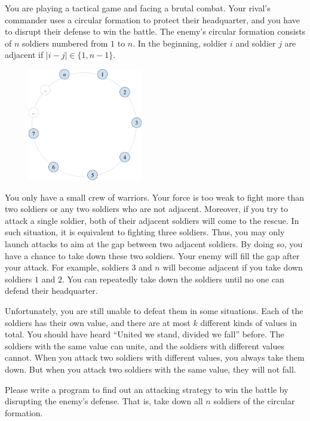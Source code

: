 You are playing a tactical game and facing a brutal combat. 
Your rival's commander uses a circular formation to protect their headquarter, 
and you have to disrupt their defense to win the battle.
The enemy's circular formation consists of $n$ soldiers numbered from $1$ to $n$. 
In the beginning, soldier $i$ and soldier $j$ are 
adjacent if $|i-j|\in\{1,n-1\}$.
\begin{figure}[h]
\center
\includegraphics[width=5cm]{image/d-circle.pdf}
\end{figure}

You only have a small crew of warriors. 
Your force is too weak to fight more than two soldiers or any two soldiers
who are not adjacent. 
Moreover, if you try to attack a single soldier, both of their adjacent
soldiers will come to the rescue.
In such situation, it is equivalent to fighting three soldiers.
Thus, you may only launch attacks to aim at the gap between 
two adjacent soldiers.
By doing so, you have a chance to take down these two soldiers.
Your enemy will fill the gap after your attack. 
For example, soldiers $3$ and $n$ will become adjacent
if you take down soldiers $1$ and $2$.
You can repeatedly take down the soldiers until no one can defend 
their headquarter.

Unfortunately, you are still unable to defeat them in some situations.
Each of the soldiers has their own value, 
and there are at most $k$ different kinds of values in total.
You should have heard ``United we stand, divided we fall'' before. 
The soldiers with the same value can unite, 
and the soldiers with different values cannot.
When you attack two soldiers with different values, you always take them down.
But when you attack two soldiers with the same value, they will not fall.

Please write a program to find out an attacking strategy to win the battle
by disrupting the enemy's defense. That is, take down all $n$ soldiers
of the circular formation.
